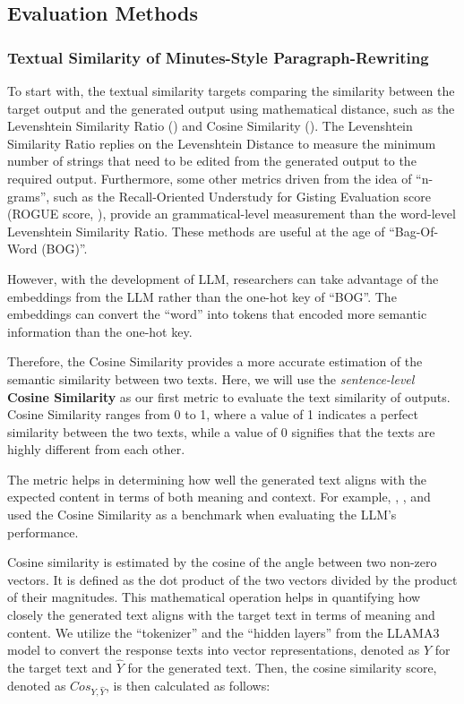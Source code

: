 \subsection*{Evaluation Methods}


\subsubsection*{Textual Similarity of Minutes-Style Paragraph-Rewriting}


To start with, the textual similarity targets comparing the similarity between the target output and the generated output using mathematical distance, such as the Levenshtein Similarity Ratio (\cite{levenshtein1966binary}) and Cosine Similarity (\cite{tanguy2016natural}). The Levenshtein Similarity Ratio replies on the Levenshtein Distance to measure the minimum number of strings that need to be edited from the generated output to the required output. Furthermore, some other metrics driven from the idea of ``n-grams'', such as the Recall-Oriented Understudy for Gisting Evaluation score (ROGUE score, \cite{lin2004rouge}), provide an grammatical-level measurement than the word-level Levenshtein Similarity Ratio. These methods are useful at the age of ``Bag-Of-Word (BOG)''.


However, with the development of LLM, researchers can take advantage of the embeddings from the LLM rather than the one-hot key of ``BOG''. The embeddings can convert the ``word'' into tokens that encoded more semantic information than the one-hot key. 


Therefore, the Cosine Similarity provides a more accurate estimation of the semantic similarity between two texts. Here, we will use the \textit{sentence-level} \textbf{Cosine Similarity} as our first metric to evaluate the text similarity of outputs. Cosine Similarity ranges from 0 to 1, where a value of 1 indicates a perfect similarity between the two texts, while a value of 0 signifies that the texts are highly different from each other.


The metric helps in determining how well the generated text aligns with the expected content in terms of both meaning and context. For example, \cite{aynetdinov2024semscore}, \cite{kim2024comparison}, and \cite{yauney2023data} used the Cosine Similarity as a benchmark when evaluating the LLM's performance.

Cosine similarity is estimated by the cosine of the angle between two non-zero vectors. It is defined as the dot product of the two vectors divided by the product of their magnitudes. This mathematical operation helps in quantifying how closely the generated text aligns with the target text in terms of meaning and content. We utilize the ``tokenizer'' and the ``hidden layers'' from the LLAMA3 model to convert the response texts into vector representations, denoted as $Y$ for the target text and $\hat{Y}$ for the generated text. Then, the cosine similarity score, denoted as $Cos_{Y, \hat{Y}}$, is then calculated as follows:



